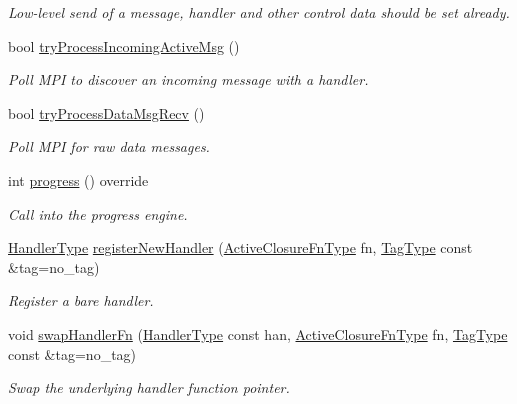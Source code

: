 \begin{DoxyCompactItemize}
\begin{DoxyCompactList}\small\item\em Low-\/level send of a message, handler and other control data should be set already. \end{DoxyCompactList}\item 
bool \hyperlink{structvt_1_1messaging_1_1_active_messenger_a65ec9bc6f62213cac6320ea76cdd4d47}{try\+Process\+Incoming\+Active\+Msg} ()
\begin{DoxyCompactList}\small\item\em Poll M\+PI to discover an incoming message with a handler. \end{DoxyCompactList}\item 
bool \hyperlink{structvt_1_1messaging_1_1_active_messenger_af4dafc0786bb0515293356e78035a71e}{try\+Process\+Data\+Msg\+Recv} ()
\begin{DoxyCompactList}\small\item\em Poll M\+PI for raw data messages. \end{DoxyCompactList}\item 
int \hyperlink{structvt_1_1messaging_1_1_active_messenger_a4cd83c125e144ecbd9425fa7cd194538}{progress} () override
\begin{DoxyCompactList}\small\item\em Call into the progress engine. \end{DoxyCompactList}\item 
\hyperlink{namespacevt_af64846b57dfcaf104da3ef6967917573}{Handler\+Type} \hyperlink{structvt_1_1messaging_1_1_active_messenger_a018435c71415f6f10dc578230397a85c}{register\+New\+Handler} (\hyperlink{namespacevt_a2a06c34cafcd511828f16cbf1476b924}{Active\+Closure\+Fn\+Type} fn, \hyperlink{namespacevt_a84ab281dae04a52a4b243d6bf62d0e52}{Tag\+Type} const \&tag=no\+\_\+tag)
\begin{DoxyCompactList}\small\item\em Register a bare handler. \end{DoxyCompactList}\item 
void \hyperlink{structvt_1_1messaging_1_1_active_messenger_aa5544a4d13407ec3432e2eb48a60005d}{swap\+Handler\+Fn} (\hyperlink{namespacevt_af64846b57dfcaf104da3ef6967917573}{Handler\+Type} const han, \hyperlink{namespacevt_a2a06c34cafcd511828f16cbf1476b924}{Active\+Closure\+Fn\+Type} fn, \hyperlink{namespacevt_a84ab281dae04a52a4b243d6bf62d0e52}{Tag\+Type} const \&tag=no\+\_\+tag)
\begin{DoxyCompactList}\small\item\em Swap the underlying handler function pointer. \end{DoxyCompactList}\item 

\end{DoxyCompactItemize}
